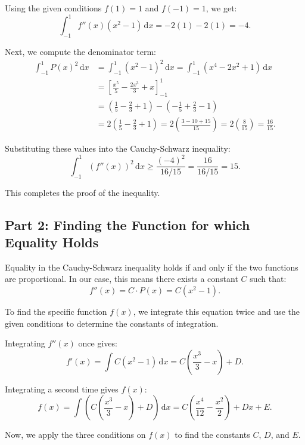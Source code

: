\documentclass[12pt,a4paper]{article}
\theoremstyle{definition}
\begin{document}
Using the given conditions $f(1) = 1$ and $f(-1) = 1$, we get:
\[ \int_{-1}^{1} f''(x)(x^2-1)\,\mathrm{d}x = -2(1) - 2(1) = -4. \]

Next, we compute the denominator term:
\begin{align*}
\int_{-1}^{1} P(x)^2\,\mathrm{d}x &= \int_{-1}^{1} (x^2-1)^2\,\mathrm{d}x = \int_{-1}^{1} (x^4 - 2x^2 + 1)\,\mathrm{d}x \\
&= \left[\frac{x^5}{5} - \frac{2x^3}{3} + x\right]_{-1}^{1} \\
&= \left(\frac{1}{5} - \frac{2}{3} + 1\right) - \left(-\frac{1}{5} + \frac{2}{3} - 1\right) \\
&= 2\left(\frac{1}{5} - \frac{2}{3} + 1\right) = 2\left(\frac{3 - 10 + 15}{15}\right) = 2\left(\frac{8}{15}\right) = \frac{16}{15}.
\end{align*}

Substituting these values into the Cauchy-Schwarz inequality:
\[ \int_{-1}^{1} (f''(x))^2 \,\mathrm{d}x \ge \frac{(-4)^2}{16/15} = \frac{16}{16/15} = 15. \]

This completes the proof of the inequality.

\subsection*{Part 2: Finding the Function for which Equality Holds}

Equality in the Cauchy-Schwarz inequality holds if and only if the two functions are proportional. In our case, this means there exists a constant $C$ such that:
\[ f''(x) = C \cdot P(x) = C(x^2 - 1). \]

To find the specific function $f(x)$, we integrate this equation twice and use the given conditions to determine the constants of integration.

Integrating $f''(x)$ once gives:
\[ f'(x) = \int C(x^2 - 1)\,\mathrm{d}x = C\left(\frac{x^3}{3} - x\right) + D. \]

Integrating a second time gives $f(x)$:
\[ f(x) = \int \left(C\left(\frac{x^3}{3} - x\right) + D\right)\,\mathrm{d}x = C\left(\frac{x^4}{12} - \frac{x^2}{2}\right) + Dx + E. \]

Now, we apply the three conditions on $f(x)$ to find the constants $C$, $D$, and $E$.
\end{document}

